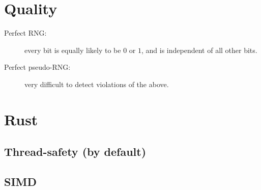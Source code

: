 \documentclass[14pt]{beamer}
\begin{document}
\section{Quality}
\begin{frame}
  \begin{description}
  \item[Perfect RNG:] every bit is equally likely to be $0$ or $1$, and is
  independent of all other bits.
  \item[Perfect pseudo-RNG:] very difficult to detect violations of the
  above.
  \end{description}
\end{frame}

\section{Rust}

\subsection[Thread-safety]{Thread-safety (by default)}
\begin{frame}

\end{frame}

\subsection{SIMD}
\begin{frame}

\end{frame}
\end{document}
